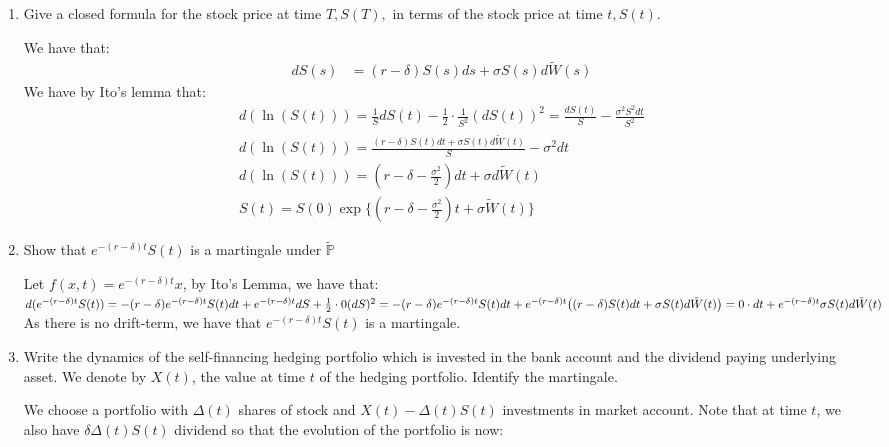 \documentclass[12pt,twoside, letter]{exam}
\theoremstyle{definition}
\newcommand{\pp}{\mathbb{P}}
\begin{document}
  \begin{enumerate}
    \item Give a closed formula for the stock price at time $T, S(T),$ in terms of the stock price at time $t, S(t)$.
      \begin{solution}
        We have that:
        \begin{align*}
          dS(s) &= (r-\delta)S(s)ds + \sigma S(s)d\tilde{W}(s)
        \end{align*}
        We have by Ito's lemma that:
        \begin{align*}
          d(\ln(S(t))) = \frac{1}{S} dS(t) - \frac{1}{2}\cdot \frac{1}{S^2} (dS(t))^2 = \frac{dS(t)}{S} - \frac{\sigma^2 S^2 dt}{S^2} \\
          d(\ln(S(t))) = \frac{(r-\delta)S(t)dt + \sigma S(t)d\tilde{W}(t)}{S} - \sigma^2 dt \\
          d(\ln(S(t))) = (r - \delta - \frac{\sigma^2}{2})dt + \sigma d\tilde{W}(t) \\
          S(t) = S(0)\exp\{(r - \delta - \frac{\sigma^2}{2})t + \sigma \tilde{W}(t)\}
        \end{align*}
      \end{solution}
    \item Show that $e^{-(r-\delta)t}S(t)$ is a martingale under $\tilde{\pp}$
      \begin{solution}
        Let $f(x,t) = e^{-(r-\delta)t}x$, by Ito's Lemma, we have that: \\
        $d(e^{-(r-\delta)t}S(t)) = -(r-\delta)e^{-(r-\delta)t}S(t) dt + e^{-(r-\delta)t} dS + \frac{1}{2}\cdot 0 (dS)^2 \\
        =-(r-\delta)e^{-(r-\delta)t}S(t) dt + e^{-(r-\delta)t} \big( (r-\delta)S(t)dt + \sigma S(t)d\tilde{W}(t) \big) \\
        = 0 \cdot dt + e^{-(r-\delta)t} \sigma S(t)d\tilde{W}(t) $ \\
        As there is no drift-term, we have that $e^{-(r-\delta)t}S(t)$ is a martingale.
      \end{solution}
    \item Write the dynamics of the self-financing hedging portfolio which is invested in the bank account and the dividend paying underlying asset. We denote
      by $X(t)$, the value at time $t$ of the hedging portfolio. Identify the martingale.
        \begin{solution}
        We choose a portfolio with $\Delta(t)$ shares of stock and $X(t) - \Delta(t)S(t)$ investments in market account.
        Note that at time $t$, we also have $\delta \Delta(t) S(t)$ dividend so that the evolution of the portfolio is now:

\end{solution}
\end{enumerate}
\end{document}
